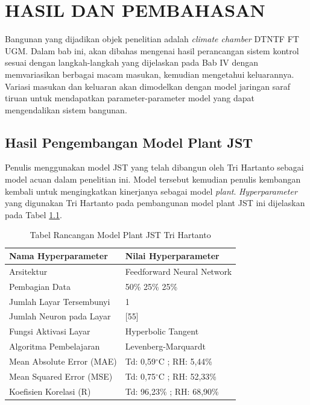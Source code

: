 \chapter{HASIL DAN PEMBAHASAN}
\label{hasil-dan-pembahasan}
Bangunan yang dijadikan objek penelitian adalah \textit{climate chamber} DTNTF FT UGM. Dalam bab ini, akan dibahas mengenai hasil perancangan sistem kontrol sesuai dengan langkah-langkah yang dijelaskan pada Bab IV dengan memvariasikan berbagai macam masukan, kemudian mengetahui keluarannya. Variasi masukan dan keluaran akan dimodelkan dengan model jaringan saraf tiruan untuk mendapatkan parameter-parameter model yang dapat mengendalikan sistem bangunan.

\section{Hasil Pengembangan Model Plant JST}

Penulis menggunakan model JST yang telah dibangun oleh Tri Hartanto\cite{skripsiTanto} sebagai model acuan dalam penelitian ini. Model tersebut kemudian penulis kembangan kembali untuk mengingkatkan kinerjanya sebagai model \textit{plant}. \textit{Hyperparameter} yang digunakan Tri Hartanto pada pembangunan model plant JST ini dijelaskan pada Tabel \ref{tbl:5:NNPlantTanto}.\\

\begin{table}[!h]
	\caption{Tabel Rancangan Model Plant JST Tri Hartanto}
	\label{tbl:5:NNPlantTanto}
	\centering
	\begin{tabular}{|p{5.7cm}|p{5cm}|}
		\hline
		\textbf{Nama Hyperparameter} & \textbf{Nilai Hyperparameter} \\ \hline
		Arsitektur & Feedforward Neural Network \\ \hline
		Pembagian Data & 50\% 25\% 25\% \\ \hline 
		Jumlah Layar Tersembunyi & 1 \\ \hline
		Jumlah Neuron pada Layar & [55] \\ \hline
		Fungsi Aktivasi Layar & Hyperbolic Tangent \\ \hline
		Algoritma Pembelajaran & Levenberg-Marquardt \\ \hline
		Mean Absolute Error (MAE) & Td: 0,59$^\circ$C ; RH: 5,44\% \\ \hline
		Mean Squared Error (MSE) & Td: 0,75$^\circ$C ; RH: 52,33\% \\ \hline
		Koefisien Korelasi (R) & Td: 96,23\% ; RH: 68,90\% \\ \hline
	\end{tabular}
\end{table}
\vspace{2em}

